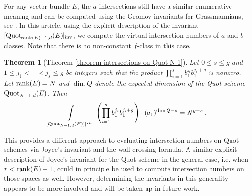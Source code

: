 \documentclass[11pt]{amsart}
\newtheorem*{theorem*}{Theorem}
\theoremstyle{remark}
\newcommand{\rk}{\textnormal{rank}}
\newcommand{\quot}[0]{\textnormal{Quot}}
\newcommand{\vir}[0]{\textnormal{vir}}
\newcommand{\inv}[0]{\textnormal{inv}}
\numberwithin{theorem}{section}
\begin{document}
For any vector bundle $E$, the $a$-intersections still have a similar enumerative meaning and can be computed using the Gromov invariants for Grassmannians,
see \cite{Hol04}.
In this article, using the explicit description of the invariant $[\quot_{\rk(E)-1,d}(E)]_\inv$, we compute the virtual intersection numbers of $a$ and $b$ classes.
Note that there is no non-constant $f$-class in this case.
\begin{theorem*}[Theorem \ref{theorem intersections on Quot N-1}]
    Let $0 \leqslant s \leqslant g$ and $1 \leqslant j_1 < \cdots < j_s \leqslant g$ be integers such that the product $\prod_{i=1}^s b_1^{j_i}b_1^{j_i+g}$ is nonzero.
    Let $\rk(E) = N$ and 
    $\dim Q$ denote the expected dimension of the Quot scheme $\quot_{N-1,d}(E)$. Then
    \begin{equation*}
        \int\limits_{[\quot_{N-1,d}(E))]^\vir}^{} \,
        \left(\prod_{i=1}^s b_1^{j_i}b_1^{j_i+g}\right) \cdot 
        (a_1)^{\dim Q-s} = N^{g-s}\,.
    \end{equation*}
\end{theorem*}    
This provides a different approach to evaluating intersection numbers on Quot schemes via Joyce's invariant and the wall-crossing formula.
A similar explicit description of Joyce's invariant for the Quot scheme in the general case,
i.e. when $r<\rk(E)-1$, could in principle be used to compute intersection numbers on those spaces as well. 
However, determining the invariants in this generality appears to be more involved and will be taken up in future work.
\end{document}
